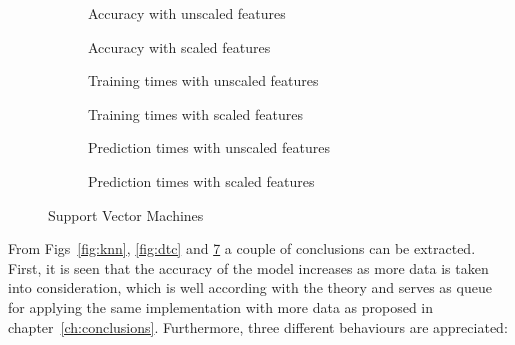 \begin{figure}
    \centering
    \begin{subfigure}[htb]{0.49\textwidth}
        \centering
        
        \caption{Accuracy with unscaled features}
        \label{fig:svc_accs}
    \end{subfigure}
    \begin{subfigure}[htb]{0.49\textwidth}
        \centering
        
        \caption{Accuracy with scaled features}
        \label{fig:svc_accs_scaled}
    \end{subfigure}
    \begin{subfigure}[b]{0.49\textwidth}
        \centering
        
        \caption{Training times with unscaled features}
        \label{fig:svc_fit_times}
    \end{subfigure}
    \begin{subfigure}[b]{0.49\textwidth}
        \centering
        
        \caption{Training times with scaled features}
        \label{fig:svc_fit_times_scaled}
    \end{subfigure}
    \begin{subfigure}[b]{0.49\textwidth}
        \centering
        
        \caption{Prediction times with unscaled features}
        \label{fig:svc_pred_times}
    \end{subfigure}
    \begin{subfigure}[b]{0.49\textwidth}
        \centering
        
        \caption{Prediction times with scaled features}
        \label{fig:dtc_pred_times_scaled}
    \end{subfigure}
    \caption{Support Vector Machines}
    \label{fig:svc}
\end{figure}

From Figs~\ref{fig:knn}, \ref{fig:dtc} and \ref{fig:svc} a couple of conclusions can be extracted. First, it is seen that the accuracy of the model increases as more data is taken into consideration, which is well according with the theory and serves as queue for applying the same implementation with more data as proposed in chapter~\ref{ch:conclusions}. Furthermore, three different behaviours are appreciated:

